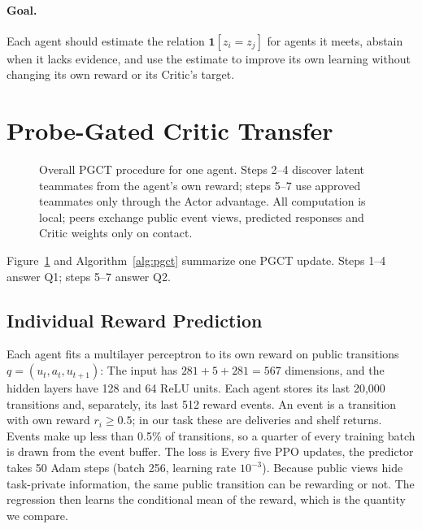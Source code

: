 \documentclass{article}
\begin{document}
\paragraph{Goal.}
Each agent should estimate the relation $\mathbf 1[z_i=z_j]$ for agents it meets, abstain when it lacks evidence, and use the estimate to improve its own learning without changing its own reward or its Critic's target.

\section{Probe-Gated Critic Transfer}
\begin{figure}[t]
\centering\resizebox{.97\textwidth}{!}{}
\caption{Overall PGCT procedure for one agent. Steps 2--4 discover latent teammates from the agent's own reward; steps 5--7 use approved teammates only through the Actor advantage. All computation is local; peers exchange public event views, predicted responses and Critic weights only on contact.}\label{fig:architecture}
\end{figure}

Figure~\ref{fig:architecture} and Algorithm~\ref{alg:pgct} summarize one PGCT update. Steps 1--4 answer Q1; steps 5--7 answer Q2.

\subsection{Individual Reward Prediction}
Each agent fits a multilayer perceptron to its own reward on public transitions $q=(u_t,a_t,u_{t+1})$:
\ModelEquation
The input has $281+5+281=567$ dimensions, and the hidden layers have 128 and 64 ReLU units. Each agent stores its last 20{,}000 transitions and, separately, its last 512 reward events. An event is a transition with own reward $r_i\ge0.5$; in our task these are deliveries and shelf returns. Events make up less than 0.5\% of transitions, so a quarter of every training batch is drawn from the event buffer. The loss is
\RewardLossEquation
Every five PPO updates, the predictor takes 50 Adam steps (batch 256, learning rate $10^{-3}$). Because public views hide task-private information, the same public transition can be rewarding or not. The regression then learns the conditional mean of the reward, which is the quantity we compare.
\end{document}
